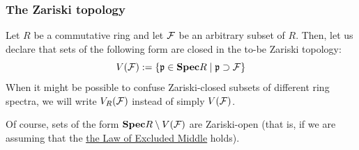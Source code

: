             \subsubsection{The Zariski topology} 
                \begin{definition} \label{def: zariski_closed}
                    Let $R$ be a commutative ring and let $\mathcal{F}$ be an arbitrary subset of $R$. Then, let us declare that sets of the following form are closed in the to-be Zariski topology:
                        $$V(\mathcal{F}) := \left\{\mathfrak{p} \in \mathbf{Spec} R \mid \mathfrak{p} \supset \mathcal{F} \right\}$$
                    When it might be possible to confuse Zariski-closed subsets of different ring spectra, we will write $V_R(\mathcal{F})$ instead of simply $V(\mathcal{F})$.
                \end{definition}
                \begin{remark}
                    Of course, sets of the form $\mathbf{Spec} R \setminus V(\mathcal{F})$ are Zariski-open (that is, if we are assuming that the \href{https://ncatlab.org/nlab/show/excluded+middle}{\underline{the Law of Excluded Middle}} holds).
                \end{remark}
                
